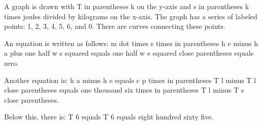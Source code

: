 A graph is drawn with T in parentheses k on the y-axis and s in parentheses k times joules divided by kilograms on the x-axis. The graph has a series of labeled points: 1, 2, 3, 4, 5, 6, and 0. There are curves connecting these points.

An equation is written as follows:
m dot times s times in parentheses h e minus h a plus one half w s squared equals one half w e squared close parentheses equals zero.

Another equation is:
h a minus h e equals c p times in parentheses T l minus T l close parentheses equals one thousand six times in parentheses T l minus T s close parentheses.

Below this, there is:
T 6 equals T 6 equals eight hundred sixty five.